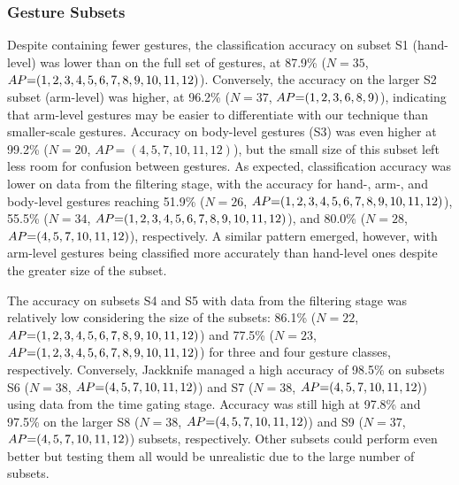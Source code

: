\subsubsection{Gesture Subsets} \label{sec:radar-experiments:gesture-subsets:results:gesture-subsets}
Despite containing fewer gestures, the classification accuracy on subset S1 (hand-level) was lower than on the full set of gestures, at 87.9\% ($N{=}35$, $\splitatcommas{AP{=}(1, 2, 3, 4, 5, 6, 7, 8, 9, 10, 11, 12)}$).
Conversely, the accuracy on the larger S2 subset (arm-level) was higher, at 96.2\% ($N{=}37$, $\splitatcommas{AP{=}(1, 2, 3, 6, 8, 9)}$), indicating that arm-level gestures may be easier to differentiate with our technique than smaller-scale gestures.
Accuracy on body-level gestures (S3) was even higher at 99.2\% ($N{=}20$, $AP{=}(4, 5, 7, 10, 11, 12)$), but the small size of this subset left less room for confusion between gestures.
As expected, classification accuracy was lower on data from the filtering stage, with the accuracy for hand-, arm-, and body-level gestures reaching 51.9\% ($N{=}26$, $\splitatcommas{AP{=}(1, 2, 3, 4, 5, 6, 7, 8, 9, 10, 11, 12)}$), 55.5\% ($N{=}34$, $\splitatcommas{AP{=}(1, 2, 3, 4, 5, 6, 7, 8, 9, 10, 11, 12)}$), and 80.0\% ($N{=}28$, $\splitatcommas{AP{=}(4, 5, 7, 10, 11, 12)}$), respectively. A similar pattern emerged, however, with arm-level gestures being classified more accurately than hand-level ones despite the greater size of the subset.

The accuracy on subsets S4 and S5 with data from the filtering stage was relatively low considering the size of the subsets: 86.1\% ($N{=}22$, $\splitatcommas{AP{=}(1, 2, 3, 4, 5, 6, 7, 8, 9, 10, 11, 12)}$) and 77.5\% ($N{=}23$, $\splitatcommas{AP{=}(1, 2, 3, 4, 5, 6, 7, 8, 9, 10, 11, 12)}$) for three and four gesture classes, respectively.
Conversely, Jackknife managed a high accuracy of 98.5\% on subsets S6 ($N{=}38$, $\splitatcommas{AP{=}(4, 5, 7, 10, 11, 12)}$) and S7 ($N{=}38$, $\splitatcommas{AP{=}(4, 5, 7, 10, 11, 12)}$) using data from the time gating stage. Accuracy was still high at 97.8\% and 97.5\% on the larger S8 ($N{=}38$, $\splitatcommas{AP{=}(4, 5, 7, 10, 11, 12)}$) and S9 ($N{=}37$, $\splitatcommas{AP{=}(4, 5, 7, 10, 11, 12)}$) subsets, respectively. Other subsets could perform even better but testing them all would be unrealistic due to the large number of subsets.



